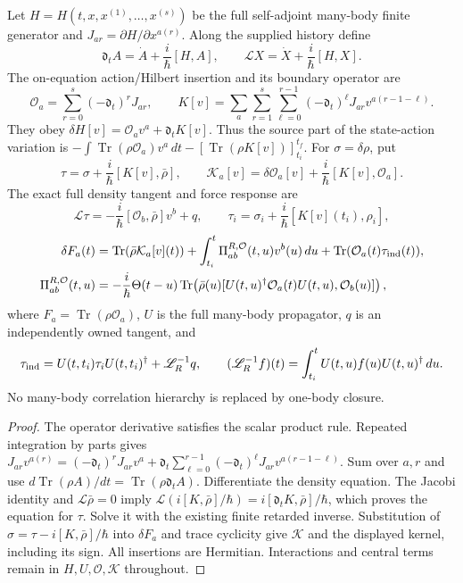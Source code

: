 \documentclass[12pt,a4paper]{article}
\begin{document}
\begin{theorem}
\label{p4:thm:v4106-functional-hilbert-response}
Let $H=H(t,x,x^{(1)},\ldots,x^{(s)})$ be the full self-adjoint
many-body finite generator and $J_{ar}=\partial H/\partial x^{a(r)}$.
Along the supplied history define
\[
 \mathfrak d_tA=\dot A+\frac{i}{\hbar}[H,A],\qquad
 \mathscr LX=\dot X+\frac{i}{\hbar}[H,X].
\]
The on-equation action/Hilbert insertion and its boundary operator are
\[
 \mathcal O_a=\sum_{r=0}^s(-\mathfrak d_t)^rJ_{ar},\qquad
 K[v]=\sum_a\sum_{r=1}^s\sum_{\ell=0}^{r-1}
            (-\mathfrak d_t)^\ell J_{ar}v^{a(r-1-\ell)}.
\]
They obey $\delta H[v]=\mathcal O_av^a+\mathfrak d_tK[v]$.
Thus the source part of the state-action variation is
$-\int\operatorname{Tr}(\rho\mathcal O_a)v^a\,dt
 -[\operatorname{Tr}(\rho K[v])]_{t_i}^{t_f}$.
For $\sigma=\delta\rho$, put
\[
 \tau=\sigma+\frac{i}{\hbar}[K[v],\bar\rho],\qquad
 \mathcal K_a[v]=\delta\mathcal O_a[v]
                       +\frac{i}{\hbar}[K[v],\mathcal O_a].
\]
The exact full density tangent and force response are
\[
 \mathscr L\tau=-\frac{i}{\hbar}[\mathcal O_b,\bar\rho]v^b+q,
 \qquad
 \tau_i=\sigma_i+\frac{i}{\hbar}[K[v](t_i),\rho_i],
\]
\begin{align*}
 \delta F_a(t)&=\operatorname{Tr}(\bar\rho\mathcal K_a[v](t))
       +\int_{t_i}^t\Pi^{R,\mathcal O}_{ab}(t,u)v^b(u)\,du
       +\operatorname{Tr}(\mathcal O_a(t)\tau_{\rm ind}(t)),\\
 \Pi^{R,\mathcal O}_{ab}(t,u)&=-\frac{i}{\hbar}\Theta(t-u)
  \operatorname{Tr}\!\left(\bar\rho(u)
  [U(t,u)^\dagger\mathcal O_a(t)U(t,u),\mathcal O_b(u)]\right),
\end{align*}
where $F_a=\operatorname{Tr}(\rho\mathcal O_a)$, $U$ is the full
many-body propagator, $q$ is an independently owned tangent, and
\[
 \tau_{\rm ind}=U(t,t_i)\tau_iU(t,t_i)^\dagger+\mathscr L_R^{-1}q,\qquad
 (\mathscr L_R^{-1}f)(t)=\int_{t_i}^tU(t,u)f(u)U(t,u)^\dagger\,du.
\]
No many-body correlation hierarchy is replaced by one-body closure.
\end{theorem}
\begin{proof}
The operator derivative satisfies the scalar product rule. Repeated
integration by parts gives
$J_{ar}v^{a(r)}=(-\mathfrak d_t)^rJ_{ar}v^a+
\mathfrak d_t\sum_{\ell=0}^{r-1}(-\mathfrak d_t)^\ell
J_{ar}v^{a(r-1-\ell)}$. Sum over $a,r$ and use
$d\operatorname{Tr}(\rho A)/dt=\operatorname{Tr}(\rho\mathfrak d_tA)$.
Differentiate the density equation. The Jacobi identity and
$\mathscr L\bar\rho=0$ imply
$\mathscr L(i[K,\bar\rho]/\hbar)=i[\mathfrak d_tK,\bar\rho]/\hbar$,
which proves the equation for $\tau$.
Solve it with the existing finite retarded inverse. Substitution of
$\sigma=\tau-i[K,\bar\rho]/\hbar$ into $\delta F_a$ and trace cyclicity
give $\mathcal K$ and the displayed kernel, including its sign.
All insertions are Hermitian. Interactions and central terms remain in
$H,U,\mathcal O,\mathcal K$ throughout.
\end{proof}
\end{document}
